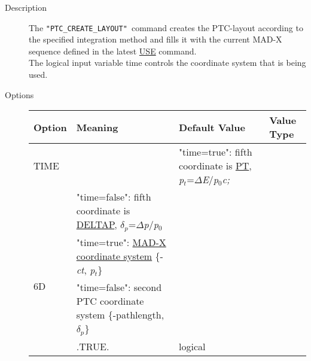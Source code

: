 \begin{description}
	\item[Description] 
The \texttt{"PTC\_CREATE\_LAYOUT" }command creates the PTC-layout
according to  the specified integration method and fills it with the
current  MAD-X sequence defined in the latest
\href{../control/general.html#use}{ USE} command. 
\\ The logical input variable time  controls the coordinate system that
is being used. 
\item[Options] 
  \begin{longtable}{l p{8cm} p{2cm} p{2cm}}
    \hline 
    \textbf{Option} & \textbf{Meaning} &  \textbf{Default Value} &
    \textbf{Value Type} \\  
    \hline
    TIME
    & 
    \begin{tabular}{p{0.2cm} p{7.0cm}}
      \multirow{2}{*}{5D} & 
      "time=true": fifth coordinate is
      \href{../Introduction/tables.html#canon}{PT},
      \textit{p$_t$}=$\Delta$\textit{E}/\textit{p}$_0$\textit{c;} \\ 
      & "time=false": fifth coordinate is
      \href{../Introduction/tables.html#canon}{DELTAP},
      \textit{$\delta$}$_\textit{p}$=$\Delta$\textit{p}/\textit{p}$_0$
      \\ 
      \hline
      \multirow{2}{*}{6D} & 
      "time=true": \href{../Introduction/tables.html#canon}{   MAD-X
        coordinate system} \{-\textit{ct}, \textit{p$_t$}\} \\ 
      & "time=false": second PTC coordinate system \{-pathlength,
      \textit{$\delta$}$_\textit{p}$\} \\       
    \end{tabular}
    & 
    .TRUE. & 
    logical\\
    

\end{longtable}
\end{description}
